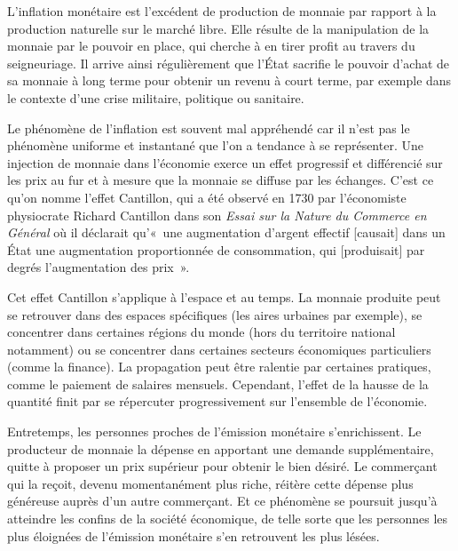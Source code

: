 L'inflation monétaire est l'excédent de production de monnaie par rapport à la production naturelle sur le marché libre. Elle résulte de la manipulation de la monnaie par le pouvoir en place, qui cherche à en tirer profit au travers du seigneuriage. Il arrive ainsi régulièrement que l'État sacrifie le pouvoir d'achat de sa monnaie à long terme pour obtenir un revenu à court terme, par exemple dans le contexte d'une crise militaire, politique ou sanitaire.


Le phénomène de l'inflation est souvent mal appréhendé car il n'est pas le phénomène uniforme et instantané que l'on a tendance à se représenter. Une injection de monnaie dans l'économie exerce un effet progressif et différencié sur les prix au fur et à mesure que la monnaie se diffuse par les échanges. C'est ce qu'on nomme l'effet Cantillon, qui a été observé en 1730 par l'économiste physiocrate Richard Cantillon dans son \emph{Essai sur la Nature du Commerce en Général} où il déclarait qu'«~une augmentation d'argent effectif [causait] dans un État une augmentation proportionnée de consommation, qui [produisait] par degrés l'augmentation des prix~». %

Cet effet Cantillon s'applique à l'espace et au temps. La monnaie produite peut se retrouver dans des espaces spécifiques (les aires urbaines par exemple), se concentrer dans certaines régions du monde (hors du territoire national notamment) ou se concentrer dans certaines secteurs économiques particuliers (comme la finance). La propagation peut être ralentie par certaines pratiques, comme le paiement de salaires mensuels. Cependant, l'effet de la hausse de la quantité finit par se répercuter progressivement sur l'ensemble de l'économie.

Entretemps, les personnes proches de l'émission monétaire s'enrichissent. Le producteur de monnaie la dépense en apportant une demande supplémentaire, quitte à proposer un prix supérieur pour obtenir le bien désiré. Le commerçant qui la reçoit, devenu momentanément plus riche, réitère cette dépense plus généreuse auprès d'un autre commerçant. Et ce phénomène se poursuit jusqu'à atteindre les confins de la société économique, de telle sorte que les personnes les plus éloignées de l'émission monétaire s'en retrouvent les plus lésées.

